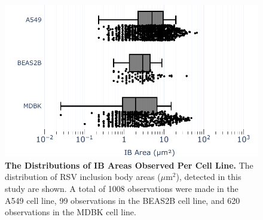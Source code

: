 \begin{figure}
    \centering
    \includegraphics[width=1\linewidth]{08. Chapter 3/Figs/01. Localisation introduction/06. box-infection.pdf}
    \caption[The Distributions of IB Areas Observed Per Cell Line.]{\textbf{The Distributions of IB Areas Observed Per Cell Line.} The distribution of RSV inclusion body areas (\(\mu \mbox{m}^2\)), detected in this study are shown. A total of 1008 observations were made in the A549 cell line, 99 observations in the BEAS2B cell line, and 620 observations in the MDBK cell line.}
    \label{fig:The Distributions of IB Areas Observed Per Cell Line}
\end{figure}